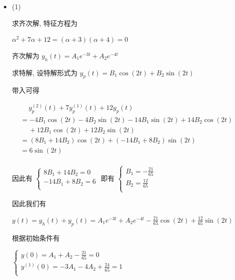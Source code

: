 \documentclass[a4paper,UTF8]{article}
\numberwithin{equation}{section}
\begin{document}
\begin{framed}
\begin{spacing}{1.5}
    \begin{itemize}
      \item (1)

      求齐次解, 特征方程为
      
      $\alpha^{2}+7\alpha+12 = (\alpha + 3) (\alpha + 4) = 0$
      
      齐次解为 $y_h(t) = A_1 e^{-3t} + A_2 e^{-4t}$
      
      求特解, 设特解形式为 $y_p(t) = B_1 \cos(2t) + B_2 \sin(2t)$
      
      带入可得
      
      $
      \begin{aligned}
      & \quad\ y_p^{(2)}(t) + 7y_p^{(1)}(t) + 12y_p(t)  \\
      & = - 4 B_{1} \cos(2t) - 4 B_{2} \sin(2t) - 14B_1\sin(2t) + 14B_2\cos(2t)  \\
      &\quad\ + 12B_1 \cos(2t) + 12B_2 \sin(2t)  \\
      & = (8 B_{1} + 14 B_{2})\cos(2 t) + (- 14 B_{1} + 8 B_{2}) \sin(2 t)  \\
      & = 6\sin(2 t)  \\
      \end{aligned}
      $
      
      因此有 $\begin{cases}
          8 B_{1} + 14 B_{2} = 0 \\
          - 14 B_{1} + 8 B_{2} = 6 \\
      \end{cases}$ 即有 $\begin{cases}
          B_{1} = - \frac{21}{65} \\
          B_{2} = \frac{12}{65} \\
      \end{cases}$
      
      因此我们有
      
      $\displaystyle y(t) = y_h(t) + y_p(t) = A_1 e^{-3t} + A_2 e^{-4t} - \frac{21}{65}\cos(2t) + \frac{12}{65}\sin(2t)$
      
      根据初始条件有
      
      $
      \begin{cases}
          \displaystyle y(0) = A_{1} + A_{2} - \frac{21}{65} = 0  \\
          \displaystyle y^{(1)}(0) = - 3 A_{1} - 4 A_{2} + \frac{24}{65} = 1  \\
      \end{cases}
      $
      

\end{itemize}
\end{spacing}
\end{framed}
\end{document}
